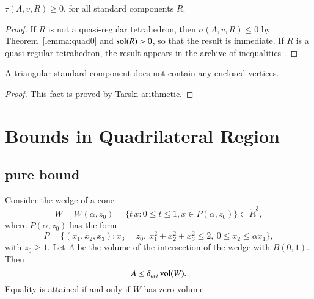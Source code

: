 \begin{lemma}\label{lemma:roger0}
    $\tau(\Lambda,v,R)\ge 0$, for all standard components $R$.
\end{lemma}


\begin{proof}
If $R$ is not a quasi-regular tetrahedron, then $\sigma(\Lambda,v,R)\le0$
by Theorem~\ref{lemma:quad0} and $\operatorname{sol}(R)> 0$, so that the result
is immediate. If $R$ is a quasi-regular tetrahedron, the result
appears in the archive of inequalities .
\end{proof}



\begin{lemma}
        \label{lemma:no-enclosed-tri}
        A triangular standard component does not contain any enclosed
        vertices.
\end{lemma}

\begin{proof}
    This fact is proved by Tarski arithmetic.
\end{proof}



\section{Bounds in Quadrilateral Region}%
    \label{sec:bounds}



\subsection{pure bound}%



\begin{lemma} \label{lemma:wedge} Consider the wedge of a cone
    $$
    W =W(\alpha,z_0) =
    \{ t\, x : 0\le t \le 1, x\in P(\alpha,z_0)\}\subset\ring{R}^3,
    $$
where $P(\alpha,z_0)$ has the form
    $$
    P = \{(x_1,x_2,x_3) :
    x_3 = z_0,\   x_1^2+x_2^2+x_3^2\le 2,\ 0\le x_2\le \alpha x_1\},
    $$
with $z_0\ge1$.  Let $A$ be the volume of the intersection of the
wedge with $B(0,1)$. Then
    $$A\le\delta_{oct}\,{\operatorname{vol}}(W).$$
Equality is attained if and only if $W$ has zero volume.
\end{lemma}

